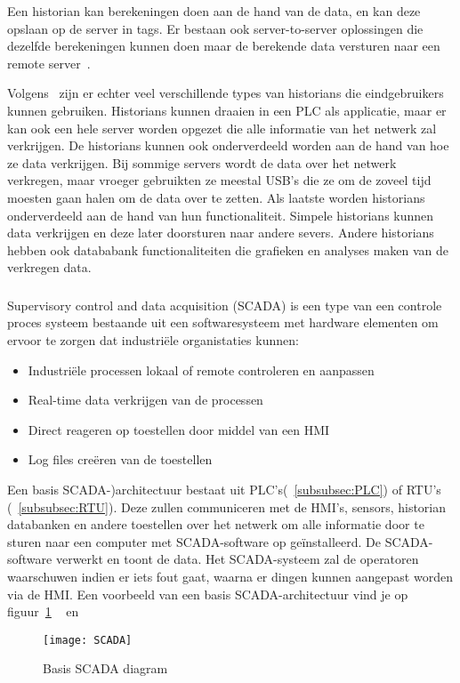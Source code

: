 Een historian kan berekeningen doen aan de hand van de data, en kan deze opslaan op de server in tags. Er bestaan ook server-to-server oplossingen die dezelfde berekeningen kunnen doen maar de berekende data versturen naar een remote server~\autocite{Solutions}. 

Volgens~\textcite{Rinaldi} zijn er echter veel verschillende types van historians die eindgebruikers kunnen gebruiken. Historians kunnen draaien in een PLC als applicatie, maar er kan ook een hele server worden opgezet die alle informatie van het netwerk zal verkrijgen. De historians kunnen ook onderverdeeld worden aan de hand van hoe ze data verkrijgen. Bij sommige servers wordt de data over het netwerk verkregen, maar vroeger gebruikten ze meestal USB's die ze om de zoveel tijd moesten gaan halen om de data over te zetten. Als laatste worden historians onderverdeeld aan de hand van hun functionaliteit. Simpele historians kunnen data verkrijgen en deze later doorsturen naar andere severs. Andere historians hebben ook datababank functionaliteiten die grafieken en analyses maken van de verkregen data.


\subsubsection{}
\label{subsubsec:SCADA}

Supervisory control and data acquisition (SCADA) is een type van een controle proces systeem bestaande uit een softwaresysteem met hardware elementen om ervoor te zorgen dat industriële organistaties kunnen: 
\begin{itemize}
    \item Industriële processen lokaal of remote controleren en aanpassen
    \item Real-time data verkrijgen van de processen
    \item Direct reageren op toestellen door middel van een HMI
    \item Log files creëren van de toestellen
\end{itemize}
Een basis SCADA-)architectuur bestaat uit PLC's(~\ref{subsubsec:PLC}) of RTU's (~\ref{subsubsec:RTU}). Deze zullen communiceren met de HMI's, sensors, historian databanken en andere toestellen over het netwerk om alle informatie door te sturen naar een computer met SCADA-software op geïnstalleerd. De SCADA-software verwerkt en toont de data. Het SCADA-systeem zal de operatoren waarschuwen indien er iets fout gaat, waarna er dingen kunnen aangepast worden via de HMI. Een voorbeeld van een basis SCADA-architectuur vind je op figuur~\ref{fig:2.7}  ~\autocite{Muthukrishnan2021} en~\autocite{2018a}
\begin{figure}
    \texttt{[image: SCADA]}
    \caption{Basis SCADA diagram~\autocite{2018a} \label{fig:2.7}} 
\end{figure}  

